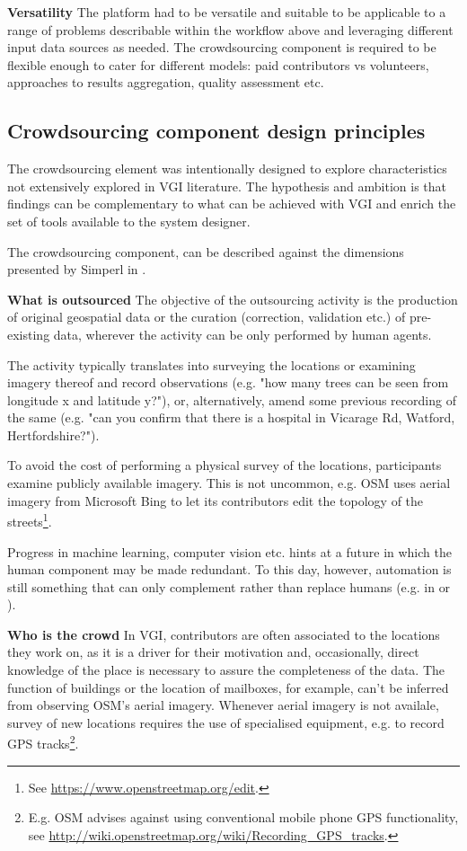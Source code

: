 \textbf{Versatility} The platform had to be versatile and suitable to be applicable to a range of problems describable within the workflow above and leveraging different input data sources as needed. The crowdsourcing component is required to be flexible enough to cater for different models: paid contributors vs volunteers, approaches to results aggregation, quality assessment etc.

\subsection{Crowdsourcing component design principles}

The crowdsourcing element was intentionally designed to explore characteristics not extensively explored in VGI literature. The hypothesis and ambition is that findings can be complementary to what can be achieved with VGI and enrich the set of tools available to the system designer.

The crowdsourcing component, can be described against the dimensions presented by Simperl in \cite{Wearethedata:2015uo}. 

\textbf{What is outsourced} The objective of the outsourcing activity is the production of original geospatial data or the curation (correction, validation etc.) of pre-existing data, wherever the activity can be only performed by human agents. 

The activity typically translates into surveying the locations or examining imagery thereof and record observations (e.g. "how many trees can be seen from longitude x and latitude y?"), or, alternatively, amend some previous recording of the same (e.g. "can you confirm that there is a hospital in Vicarage Rd, Watford, Hertfordshire?"). 

To avoid the cost of performing a physical survey of the locations, participants examine publicly available imagery. This is not uncommon, e.g. OSM uses aerial imagery from Microsoft Bing to let its contributors edit the topology of the streets\footnote{See \url{https://www.openstreetmap.org/edit}.}.

Progress in machine learning, computer vision etc. hints at a future in which the human component may be made redundant. To this day, however, automation is still something that can only complement rather than replace humans (e.g. in \cite{Goetz:1gd} or \cite{Schmid:2012we}).

\textbf{Who is the crowd} In VGI, contributors are often associated to the locations they work on, as it is a driver for their motivation and, occasionally, direct knowledge of the place is necessary to assure the completeness of the data. The function of buildings or the location of mailboxes, for example, can't be inferred from observing OSM's aerial imagery. Whenever aerial imagery is not availale, survey of new locations requires the use of specialised equipment, e.g. to record GPS tracks\footnote{E.g. OSM advises against using conventional mobile phone GPS functionality, see \url{http://wiki.openstreetmap.org/wiki/Recording_GPS_tracks}.}.

